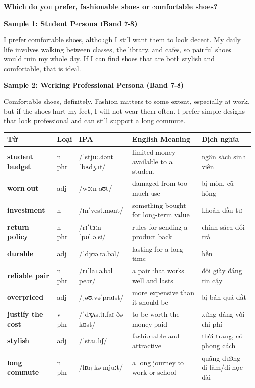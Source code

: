 \separator

\begin{ieltsquestion}
\textbf{Which do you prefer, fashionable shoes or comfortable shoes?}
\end{ieltsquestion}
\textbf{Sample 1: Student Persona (Band 7-8)}

I prefer comfortable shoes, although I still want them to look decent. My daily life involves walking between classes, the library, and cafes, so painful shoes would ruin my whole day. If I can find shoes that are both stylish and comfortable, that is ideal.

\textbf{Sample 2: Working Professional Persona (Band 7-8)}

Comfortable shoes, definitely. Fashion matters to some extent, especially at work, but if the shoes hurt my feet, I will not wear them often. I prefer simple designs that look professional and can still support a long commute.

\separator


\vspace{0.8em}
\begin{center}
\renewcommand{\arraystretch}{1.65}
\begin{tabularx}{\textwidth}{|V{0.22\textwidth}|C{0.07\textwidth}|I{0.20\textwidth}|Y|V{0.18\textwidth}|}
\hline
{}
\textbf{Từ} & \textbf{Loại} & \textbf{IPA} & \textbf{English Meaning} & \textbf{Dịch nghĩa} \\
\hline
\textbf{student budget} & n phr & /ˈstjuː.dənt ˈbʌdʒ.ɪt/ & limited money available to a student & ngân sách sinh viên \\ \hline
\textbf{worn out} & adj & /wɔːn aʊt/ & damaged from too much use & bị mòn, cũ hỏng \\ \hline
\textbf{investment} & n & /ɪnˈvest.mənt/ & something bought for long-term value & khoản đầu tư \\ \hline
\textbf{return policy} & n phr & /rɪˈtɜːn ˈpɒl.ə.si/ & rules for sending a product back & chính sách đổi trả \\ \hline
\textbf{durable} & adj & /ˈdjʊə.rə.bəl/ & lasting for a long time & bền \\ \hline
\textbf{reliable pair} & n phr & /rɪˈlaɪ.ə.bəl peər/ & a pair that works well and lasts & đôi giày đáng tin cậy \\ \hline
\textbf{overpriced} & adj & /ˌəʊ.vəˈpraɪst/ & more expensive than it should be & bị bán quá đắt \\ \hline
\textbf{justify the cost} & v phr & /ˈdʒʌs.tɪ.faɪ ðə kɒst/ & to be worth the money paid & xứng đáng với chi phí \\ \hline
\textbf{stylish} & adj & /ˈstaɪ.lɪʃ/ & fashionable and attractive & thời trang, có phong cách \\ \hline
\textbf{long commute} & n phr & /lɒŋ kəˈmjuːt/ & a long journey to work or school & quãng đường đi làm/đi học dài \\ \hline
\end{tabularx}
\end{center}

